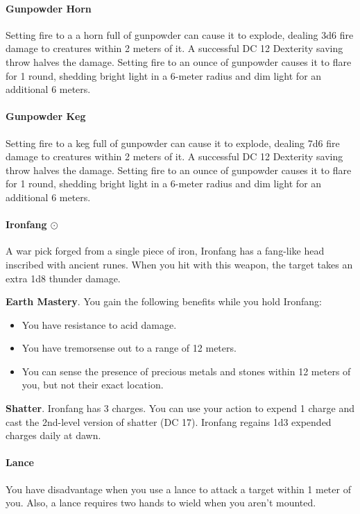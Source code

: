     \paragraph{Gunpowder Horn}
        Setting fire to a a horn full of gunpowder can cause it to explode, dealing 3d6 fire damage to creatures within 2 meters of it.
        A successful DC 12 Dexterity saving throw halves the damage.
        Setting fire to an ounce of gunpowder causes it to flare for 1 round, shedding bright light in a 6-meter radius and dim light for an additional 6 meters.
    \paragraph{Gunpowder Keg}
        Setting fire to a keg full of gunpowder can cause it to explode, dealing 7d6 fire damage to creatures within 2 meters of it.
        A successful DC 12 Dexterity saving throw halves the damage.
        Setting fire to an ounce of gunpowder causes it to flare for 1 round, shedding bright light in a 6-meter radius and dim light for an additional 6 meters.
    \paragraph{Ironfang $\odot$}
        A war pick forged from a single piece of iron, Ironfang has a fang-like head inscribed with ancient runes.
        When you hit with this weapon, the target takes an extra 1d8 thunder damage.

        \textbf{Earth Mastery}.
        You gain the following benefits while you hold Ironfang:
        \begin{itemize}
            \item You have resistance to acid damage.
            \item You have tremorsense out to a range of 12 meters.
            \item You can sense the presence of precious metals and stones within 12 meters of you, but not their exact location.
        \end{itemize}

        \textbf{Shatter}.
        Ironfang has 3 charges.
        You can use your action to expend 1 charge and cast the 2nd-level version of shatter (DC 17).
        Ironfang regains 1d3 expended charges daily at dawn.
    \paragraph{Lance}
        You have disadvantage when you use a lance to attack a target within 1 meter of you.
        Also, a lance requires two hands to wield when you aren't mounted.
